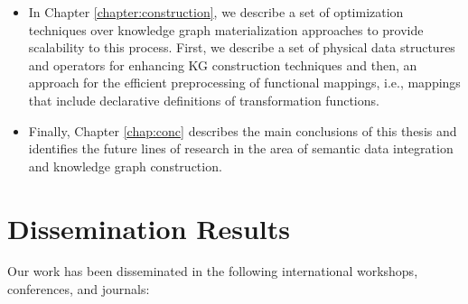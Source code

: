 \begin{itemize}
    \item In Chapter \ref{chapter:construction}, we describe a set of optimization techniques over knowledge graph materialization approaches to provide scalability to this process. First, we describe a set of physical data structures and operators for enhancing KG construction techniques and then, an approach for the efficient preprocessing of functional mappings, i.e., mappings that include declarative definitions of transformation functions.
    \item Finally, Chapter \ref{chap:conc} describes the main conclusions of this thesis and identifies the future lines of research in the area of semantic data integration and knowledge graph construction.
\end{itemize}


\section{Dissemination Results}
\label{sec:disresults}

Our work has been disseminated in the following international workshops, conferences, and journals:

